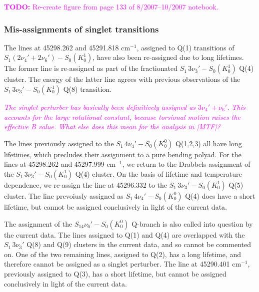 \documentclass[12pt]{mitthesis}
\newcommand{\TODO} [1]{\textcolor{magenta}{\textbf{TODO:} #1}}
\newcommand{\POINT}[1]{\textcolor{magenta}{\emph{#1}}}
\newcommand{\rcm}{cm$^{-1}$}
\newcommand{\sing}{$S_1\,3\nu_3'$ }
\newcommand{\strans} {$S_1\,3\nu_3'-S_0(K_0^1)$ }
\newcommand{\fftrans}{$S_1\,4\nu_4'-S_0(K_0^0)$ }
\begin{document}
\TODO{Re-create figure from page 133 of 8/2007--10/2007 notebook.}

\subsubsection{Mis-assignments of singlet transitions}

The lines at 45298.262 and 45291.818 \rcm, assigned to Q(1) transitions of
$S_1(2\nu_4' + 2\nu_6')-S_0(K^1_0)$, have also been re-assigned due to long
lifetimes.  The former line is re-assigned as part of the fractionated
\strans Q(4) cluster.  The energy of the latter line
agrees with previous observations of the \strans Q(8) transition.

\POINT{The singlet perturber has basically been definitively assigned
  as $3\nu_4'+\nu_6'$.  This accounts for the large rotational
  constant, because torsional motion raises the effective B value.
  What else does this mean for the analysis in [MTF]?}

The lines previously assigned to the \fftrans Q(1,2,3) all have long
lifetimes, which precludes their assignment to a pure bending polyad.
For the lines at 45298.262 and 45297.999 \rcm, we return to the
Drabbels assignment of the \strans Q(4) cluster.  On the basis of
lifetime and temperature dependence, we re-assign the line at
45296.332 to the \strans Q(5) cluster.  The line prevoiusly assigned
as \fftrans Q(4) does have a short lifetime, but cannot be assigned
conclusively in light of the current data.

The assignment of the $S_14\nu_6'-S_0(K_0^0)$ Q-branch is also called
into question by the current data.  The lines assigned to Q(1) and
Q(4) are overlapped with the \sing Q(8) and Q(9) clusters in the
current data, and so cannot be commented on.  One of the two remaining
lines, assigned to Q(2), has a long lifetime, and therefore cannot be
assigned as a singlet perturber.  The line at 45290.401 \rcm,
previously assigned to Q(3), has a short lifetime, but cannot be
assigned conclusively in light of the current data.
\end{document}
